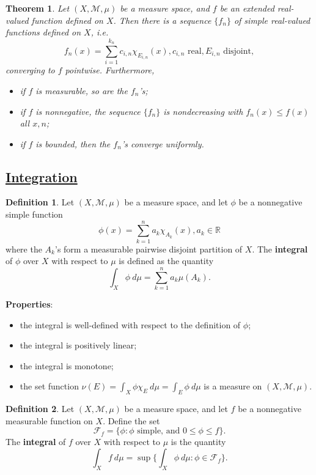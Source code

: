 \documentclass[11pt]{amsart}
\newtheorem*{theorem*}{Theorem}
\theoremstyle{definition}
\newtheorem*{definition*}{Definition}
\renewcommand\leq{\leqslant}
\renewcommand\:{\colon}
\newcommand{\calF}{\mathcal{F}}
\newcommand{\calM}{\mathcal{M}}
\newcommand{\R}{\mathds{R}}
\newcommand{\dmu}{\ d\mu}
\begin{document}
\begin{theorem*}
	Let $(X, \calM, \mu)$ be a measure space, and $f$ be an extended real-valued function defined on $X$. Then there is a sequence $\{f_n\}$ of simple real-valued functions defined on $X$, i.e.
		\[ f_n(x) = \sum_{i=1}^{k_n} c_{i,n} \chi_{E_{i,n}}(x), c_{i,n} \text{ real}, E_{i,n} \text{ disjoint}, \]
	converging to $f$ pointwise. Furthermore,
	\begin{itemize}[leftmargin=22.5pt]\setlength\itemsep{0em}
		\item[\textnormal{(i)}] if $f$ is measurable, so are the $f_n$'s;
		\item[\textnormal{(ii)}] if $f$ is nonnegative, the sequence $\{f_n\}$ is nondecreasing with $f_n(x) \leq f(x)$ all $x, n$;
		\item[\textnormal{(iii)}] if $f$ is bounded, then the $f_n$'s converge uniformly.
	\end{itemize}
\end{theorem*}
\vskip20pt



\subsection*{\underline{Integration}}

\begin{definition*}
	Let $(X, \calM, \mu)$ be a measure space, and let $\phi$ be a nonnegative simple function
		\[ \phi(x) = \sum_{k=1}^n a_k \chi_{A_k}(x), a_k \in \R \]
	where the $A_k$'s form a measurable pairwise disjoint partition of $X$. The \textbf{integral} of $\phi$ over $X$ with respect to $\mu$ is defined as the quantity
		\[ \int_X \phi \dmu = \sum_{k=1}^n a_k \mu(A_k). \]
\end{definition*}

\clearpage

\noindent \textbf{Properties}:
\begin{itemize}[leftmargin=*]\setlength\itemsep{0em}
	\item the integral is well-defined with respect to the definition of $\phi$;
	\item the integral is positively linear; 
	\item the integral is monotone;
	\item the set function $\nu(E) = \int_X \phi \chi_E \dmu = \int_E \phi \dmu$ is a measure on $(X, \calM, \mu)$.
\end{itemize}

\begin{definition*}
	Let $(X, \calM, \mu)$ be a measure space, and let $f$ be a nonnegative measurable function on $X$. Define the set 
		\[ \calF_f = \{ \phi \: \phi \text{ simple, and } 0 \leq \phi \leq f\}. \]
	The \textbf{integral} of $f$ over $X$ with respect to $\mu$ is the quantity
		\[ \int_X f \dmu = \sup \bigg\{ \int_X \phi \dmu : \phi \in \calF_f \bigg\}. \]
\end{definition*}
\end{document}
